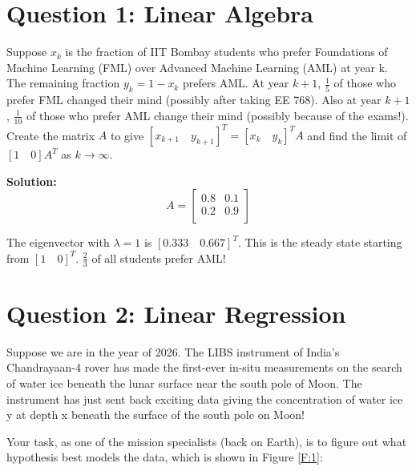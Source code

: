 \documentclass[12pt]{article}
\begin{document}
	\MakeScribeTop
	
	
	\section*{Question 1: Linear Algebra}
	Suppose $x_k$ is the fraction of IIT Bombay students who prefer Foundations of Machine Learning (FML) over Advanced Machine Learning (AML) at year k. The remaining fraction $y_k = 1-x_k$ prefers AML. At year $k+1$, $\frac{1}{5}$ of those who prefer FML changed their mind (possibly after taking EE 768). Also at year $k+1$, $\frac{1}{10}$ of those who prefer AML change their mind (possibly because of the exams!). Create the matrix $A$ to give $[x_{k+1} \quad y_{k+1}]^T = [x_k \quad y_k]^TA$ and find the limit of $[1 \quad 0]A^T$ as $k \rightarrow \infty$.
	
	\begin{framed}
		\textbf{Solution:}
		\begin{equation}
			A = \begin{bmatrix}
				0.8 & 0.1 \\
				0.2 & 0.9 \\
			\end{bmatrix}
		\end{equation}
		
		The eigenvector with $\lambda = 1$ is $[0.333 \quad 0.667]^T$. This is the steady state starting from $[1 \quad 0]^T$. $\frac{2}{3}$ of all students prefer AML!
	\end{framed}
	
	\section*{Question 2: Linear Regression}
	Suppose we are in the year of 2026. The LIBS instrument of India's Chandrayaan-4 rover has made the first-ever in-situ measurements on the search of water ice beneath the lunar surface near the south pole of Moon. The instrument has just sent back exciting data giving the concentration of water ice y at depth x beneath the surface of the south pole on Moon!

	Your task, as one of the mission specialists (back on Earth), is to figure out what hypothesis best models the data, which is shown in Figure \ref{F:1}:
\end{document}
